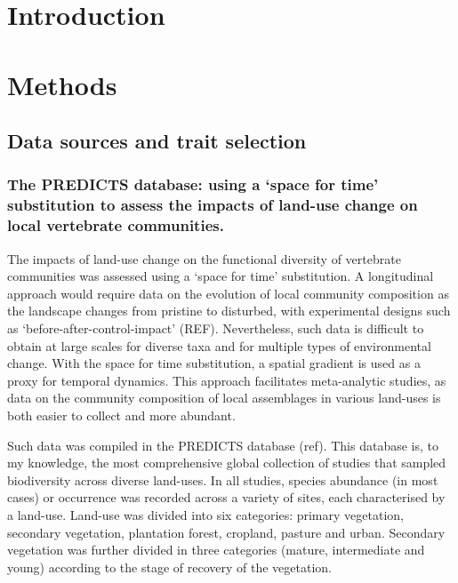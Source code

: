\section{Introduction}
\section{Methods}

\subsection{Data sources and trait selection}

\subsubsection{The PREDICTS database: using a `space for time' substitution to assess the impacts of land-use change on local vertebrate communities.}
The impacts of land-use change on the functional diversity of vertebrate communities was assessed using a `space for time' substitution. A longitudinal approach would require data on the evolution of local community composition as the landscape changes from pristine to disturbed, with experimental designs such as `before-after-control-impact' (REF). Nevertheless, such data is difficult to obtain at large scales for diverse taxa and for multiple types of environmental change. With the space for time substitution, a spatial gradient is used as a proxy for temporal dynamics. This approach facilitates meta-analytic studies, as data on the community composition of local assemblages in various land-uses is both easier to collect and more abundant. 

Such data was compiled in the PREDICTS database (ref). This database is, to my knowledge, the most comprehensive global collection of studies that sampled biodiversity across diverse land-uses. In all studies, species abundance (in most cases) or occurrence was recorded across a variety of sites, each characterised by a land-use. Land-use was divided into six categories: primary vegetation, secondary vegetation, plantation forest, cropland, pasture and urban. Secondary vegetation was further divided in three categories (mature, intermediate and young) according to the stage of recovery of the vegetation. %


